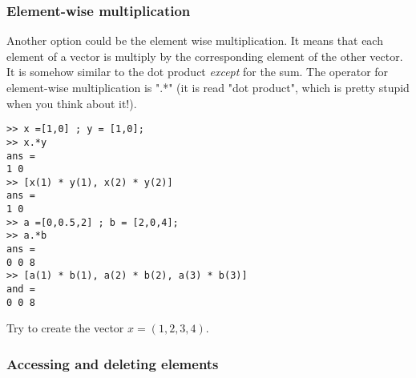 		\subsubsection{Element-wise multiplication}
			Another option could be the element wise multiplication.
			It means that each element of a vector is multiply by the corresponding element of the other vector.
			It is somehow similar to the dot product \emph{except} for the sum.
			The operator for element-wise multiplication is ".*" (it is read "dot product", which is pretty stupid when you think about it!).
\begin{lstlisting}
>> x =[1,0] ; y = [1,0];
>> x.*y
ans = 
1 0
>> [x(1) * y(1), x(2) * y(2)]
ans =
1 0
>> a =[0,0.5,2] ; b = [2,0,4];
>> a.*b
ans = 
0 0 8
>> [a(1) * b(1), a(2) * b(2), a(3) * b(3)]
and =
0 0 8
\end{lstlisting}

Try to create the vector $x = (1,2,3,4)$.

		\subsubsection{Accessing and deleting elements}
